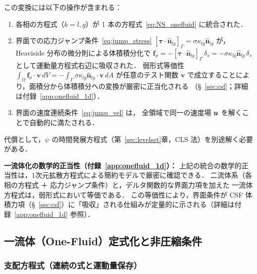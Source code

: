 この変換には以下の操作が含まれる：
\begin{enumerate}
  \item 各相の方程式（$k=l,g$）が 1 本の方程式~\eqref{eq:NS_onefluid} に統合された．
  \item 界面での応力ジャンプ条件~\eqref{eq:jump_stress}
        $[\bm{\tau}\cdot\hat{\bm n}_{lg}]_\Gamma = \sigma\kappa_{lg}\hat{\bm n}_{lg}$ が，
        Heaviside 分布の微分則による体積積分化で
        $\bm{f}_\sigma = -[\bm{\tau}\cdot\hat{\bm n}_{lg}]_\Gamma\,\delta_s
        = -\sigma\kappa_{lg}\hat{\bm n}_{lg}\,\delta_s$
        として運動量方程式右辺に吸収された．
        弱形式等価性 $\int_\Omega\bm{f}_\sigma\!\cdot\!\bm{v}\,dV = -\int_\Gamma\sigma\kappa_{lg}\hat{\bm n}_{lg}\!\cdot\!\bm{v}\,dA$
        が任意のテスト関数 $\bm{v}$ で成立することにより，面積分から体積積分への変換が厳密に正当化される
        （§~\ref{sec:csf}；詳細は付録~\ref{app:onefluid_1d}）．
  \item 界面の速度連続条件~\eqref{eq:jump_vel} は，
        全領域で同一の速度場 $\bm{u}$ を解くことで自動的に満たされる．
\end{enumerate}
代償として，$\psi$ の時間発展方程式（第~\ref{sec:levelset}章，CLS 法）を別途解く必要がある．

\medskip
\noindent\textbf{一流体化の数学的正当性（付録~\ref{app:onefluid_1d}）：}
上記の統合の数学的正当性は，1次元拡散方程式による簡約モデルで厳密に確認できる．
二流体系（各相の方程式 ＋ 応力ジャンプ条件）と，デルタ関数的な界面力項を加えた
一流体方程式は，弱形式において等価である．
この等価性により，界面条件が CSF 体積力項（§~\ref{sec:csf}）に「吸収」される仕組みが定量的に示される（詳細は付録~\ref{app:onefluid_1d} 参照）．

\subsection{一流体（One-Fluid）定式化と非圧縮条件}
\label{sec:onefluid}

\subsubsection{支配方程式（連続の式と運動量保存）}

